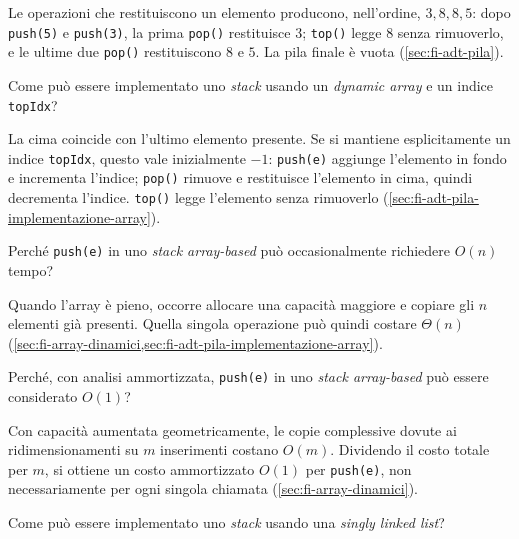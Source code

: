 Le operazioni che restituiscono un elemento producono, nell'ordine, \(3,8,8,5\):
dopo \texttt{push(5)} e \texttt{push(3)}, la prima \texttt{pop()} restituisce
\(3\); \texttt{top()} legge \(8\) senza rimuoverlo, e le ultime due
\texttt{pop()} restituiscono \(8\) e \(5\). La pila finale è vuota
(\cref{sec:fi-adt-pila}).

\begin{exercise}
\label{ex:fi-esercizi-strutture-dati-stack-array-topidx}
Come può essere implementato uno \emph{stack} usando un \emph{dynamic array} e
un indice \texttt{topIdx}?
\end{exercise}

La cima coincide con l'ultimo elemento presente. Se si mantiene
esplicitamente un indice \texttt{topIdx}, questo vale inizialmente \(-1\):
\texttt{push(e)} aggiunge l'elemento in fondo e incrementa l'indice;
\texttt{pop()} rimuove e restituisce l'elemento in cima, quindi decrementa
l'indice. \texttt{top()} legge l'elemento senza rimuoverlo
(\cref{sec:fi-adt-pila-implementazione-array}).

\begin{exercise}
\label{ex:fi-esercizi-strutture-dati-stack-push-resize}
Perché \texttt{push(e)} in uno \emph{stack array-based} può occasionalmente
richiedere \(O(n)\) tempo?
\end{exercise}

Quando l'array è pieno, occorre allocare una capacità maggiore e copiare gli
\(n\) elementi già presenti. Quella singola operazione può quindi costare
\(\Theta(n)\)
(\cref{sec:fi-array-dinamici,sec:fi-adt-pila-implementazione-array}).

\begin{exercise}
\label{ex:fi-esercizi-strutture-dati-stack-push-ammortizzato}
Perché, con analisi ammortizzata, \texttt{push(e)} in uno \emph{stack
array-based} può essere considerato \(O(1)\)?
\end{exercise}

Con capacità aumentata geometricamente, le copie complessive dovute ai
ridimensionamenti su \(m\) inserimenti costano \(O(m)\). Dividendo il costo
totale per \(m\), si ottiene un costo ammortizzato \(O(1)\) per
\texttt{push(e)}, non necessariamente per ogni singola chiamata
(\cref{sec:fi-array-dinamici}).

\begin{exercise}
\label{ex:fi-esercizi-strutture-dati-stack-linked-implementazione}
Come può essere implementato uno \emph{stack} usando una \emph{singly linked
list}?
\end{exercise}

